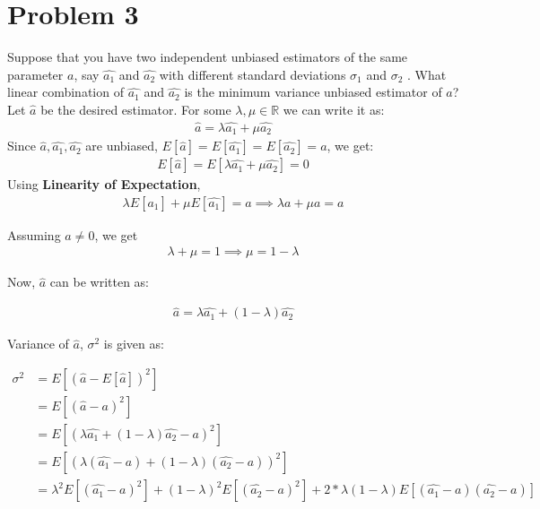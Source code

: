 \section*{Problem 3}
\noindent Suppose that you have two independent unbiased estimators of the same parameter $a$, say $\hat{a_1}$ and  $\hat{a_2}$ with different standard deviations $\sigma_1$ and $\sigma_2$ . What linear combination of $\hat{a_1}$ and $\hat{a_2}$ is the minimum variance unbiased estimator of $a$? \\ 

\noindent Let $\hat{a}$ be the desired estimator. For some $\lambda, \mu \in \mathbb{R}$ we can write it as:
\begin{align*}
\hat{a} = \lambda \hat{a_1} + \mu \hat{a_2}
\end{align*}
Since $\hat{a} , \hat{a_1} , \hat{a_2}$ are unbiased, $E[\hat{a}] = E[\hat{a_1}] = E[\hat{a_2}] = a$, we get:
\begin{align*}
    E[\hat{a}] = E[\lambda \hat{a_1} + \mu \hat{a_2}] = 0
\end{align*}
Using \textbf{Linearity of Expectation}, 
\begin{align*}
 \lambda E[\hat{a_1}] + \mu E[\hat{a_1}] = a 
\implies \lambda a  + \mu a = a
\end{align*}
 

\noindent Assuming $a \neq 0$, we get
\begin{align*}
\lambda   + \mu  = 1
\implies  \mu  = 1 - \lambda
\end{align*}

\noindent Now, $\hat{a}$ can be written as: 


\begin{align*}
\hat{a} = \lambda \hat{a_1} + (1 - \lambda) \hat{a_2}
\end{align*} 

\noindent Variance of $\hat{a}$, $\sigma^2$ is given as:

\begin{align*}
\sigma^2 &= E[(\hat{a} - E[\hat{a}])^2]  \\ 
&= E[(\hat{a} - a)^2] \\ 
&= E[(\lambda \hat{a_1} + (1 - \lambda) \hat{a_2} - a)^2] \\ 
&= E[(\lambda (\hat{a_1} - a) + (1 - \lambda) (\hat{a_2} - a))^2] \\
&= \lambda^2 E[(\hat{a_1} - a)^2]+ (1 - \lambda)^2 E[(\hat{a_2} - a)^2] + 2 * \lambda (1 - \lambda) E[(\hat{a_1} - a)  (\hat{a_2} - a)]
\end{align*}

